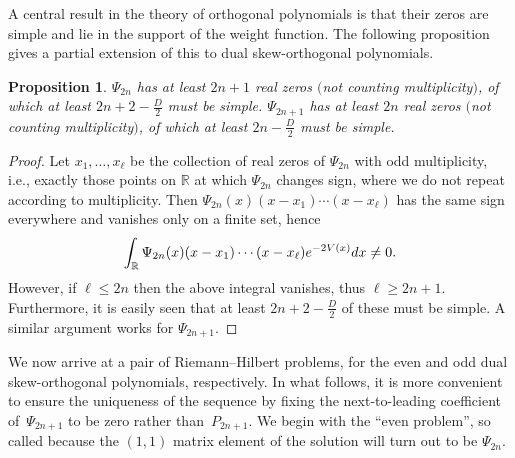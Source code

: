 \documentclass[11pt]{article}
\numberwithin{equation}{section}
\numberwithin{equation}{section}
\newtheorem{Proposition}[Theorem]{Proposition}
\begin{document}
A central result in the theory of orthogonal polynomials is that their zeros are simple and lie in the support of the weight function. The following proposition gives a partial extension of this to dual skew-orthogonal polynomials.
\begin{Proposition}
$\Psi_{2n}$ has at least $2n+1$ real zeros $($not counting multiplicity$)$, of which at least $2n+2-\frac{D}{2}$ must be simple. $\Psi_{2n+1}$ has at least $2n$ real zeros $($not counting multiplicity$)$, of which at least $2n - \frac{D}{2}$ must be simple.
\end{Proposition}
\begin{proof}
Let $ x_1, \dots, x_\ell$ be the collection of real zeros of $\Psi_{2n}$ with odd multiplicity, i.e., exactly those points on $\mathbb{R}$ at which $\Psi_{2n}$ changes sign, where we do not repeat according to multiplicity. Then $\Psi_{2n}(x)(x-x_1)\cdots (x-x_\ell)$ has the same sign everywhere and vanishes only on a finite set, hence
\begin{equation*}
\int_\mathbb{R} \Psi_{2n}(x)(x-x_1)\cdots (x-x_\ell) {\rm e}^{-2V(x)} {\rm d}x \neq 0 .
\end{equation*}
However, if $\ell \leq 2n$ then the above integral vanishes, thus $\ell \geq 2n+1$. Furthermore, it is easily seen that at least $2n+2-\frac{D}{2}$ of these must be simple. A similar argument works for $\Psi_{2n+1}$.
\end{proof}

We now arrive at a pair of Riemann--Hilbert problems, for the even and odd dual skew-orthogonal polynomials, respectively. In what follows, it is more convenient to ensure the uniqueness of the sequence by fixing the next-to-leading coefficient of~$\Psi_{2n+1}$ to be zero rather than~$P_{2n+1}$. We begin with the \enquote{even problem}, so called because the $(1,1)$ matrix element of the solution will turn out to be $\Psi_{2n}$.
\end{document}
